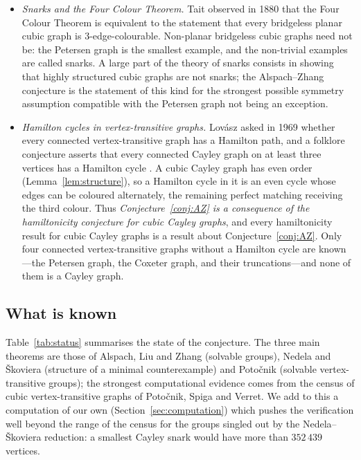 \documentclass[11pt,a4paper]{article}
\theoremstyle{definition}
\theoremstyle{remark}
\begin{document}
\begin{itemize}[leftmargin=2em]
\item \emph{Snarks and the Four Colour Theorem.}  Tait observed in 1880 that the Four Colour Theorem is equivalent to the statement that every bridgeless planar cubic graph is $3$-edge-colourable.  Non-planar bridgeless cubic graphs need not be: the Petersen graph is the smallest example, and the non-trivial examples are called snarks.  A large part of the theory of snarks consists in showing that highly structured cubic graphs are not snarks; the Alspach--Zhang conjecture is the statement of this kind for the strongest possible symmetry assumption compatible with the Petersen graph not being an exception.
\item \emph{Hamilton cycles in vertex-transitive graphs.}  Lov\'asz asked in 1969 whether every connected vertex-transitive graph has a Hamilton path, and a folklore conjecture asserts that every connected Cayley graph on at least three vertices has a Hamilton cycle \cite{CurranGallian96,KutnarMarusic09}.  A cubic Cayley graph has even order (Lemma~\ref{lem:structure}), so a Hamilton cycle in it is an even cycle whose edges can be coloured alternately, the remaining perfect matching receiving the third colour.  Thus \emph{Conjecture~\ref{conj:AZ} is a consequence of the hamiltonicity conjecture for cubic Cayley graphs}, and every hamiltonicity result for cubic Cayley graphs is a result about Conjecture~\ref{conj:AZ}.  Only four connected vertex-transitive graphs without a Hamilton cycle are known---the Petersen graph, the Coxeter graph, and their truncations---and none of them is a Cayley graph.
\end{itemize}

\subsection*{What is known}
Table~\ref{tab:status} summarises the state of the conjecture.  The three main theorems are those of Alspach, Liu and Zhang (solvable groups), Nedela and \v{S}koviera (structure of a minimal counterexample) and Poto\v{c}nik (solvable vertex-transitive groups); the strongest computational evidence comes from the census of cubic vertex-transitive graphs of Poto\v{c}nik, Spiga and Verret.  We add to this a computation of our own (Section~\ref{sec:computation}) which pushes the verification well beyond the range of the census for the groups singled out by the Nedela--\v{S}koviera reduction: a smallest Cayley snark would have more than $352\,439$ vertices.
\end{document}
